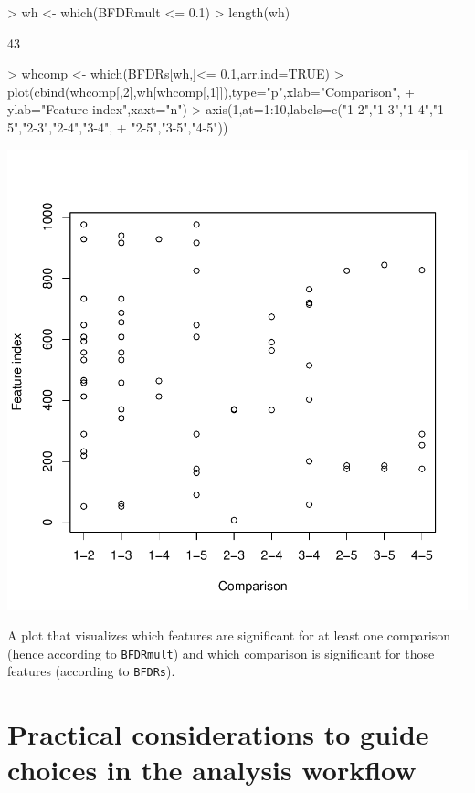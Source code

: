 \documentclass[11pt]{article}
\begin{document}
\begin{Schunk}
\begin{Sinput}
> wh <- which(BFDRmult <= 0.1)
> length(wh)
\end{Sinput}
\begin{Soutput}
[1] 43
\end{Soutput}
\end{Schunk}

\begin{Schunk}
\begin{Sinput}
> whcomp <- which(BFDRs[wh,]<= 0.1,arr.ind=TRUE)
> plot(cbind(whcomp[,2],wh[whcomp[,1]]),type="p",xlab="Comparison",
+ ylab="Feature index",xaxt="n")
> axis(1,at=1:10,labels=c("1-2","1-3","1-4","1-5","2-3","2-4","3-4",
+ "2-5","3-5","4-5"))
\end{Sinput}
\end{Schunk}
\includegraphics{ShrinkBayes-077}

\noindent
A plot that visualizes which features are significant for at least one comparison (hence according to
{\tt BFDRmult}) and which comparison is significant for those features (according to {\tt BFDRs}).

\section{Practical considerations to guide choices in the analysis workflow}\label{practical}
\end{document}

